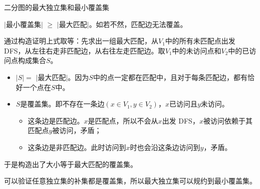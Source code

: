 \documentclass{beamer}
\def\ge{\geqslant}
\begin{document}
\begin{frame}{二分图的最大独立集和最小覆盖集}

	$|$最小覆盖集$|$ $\ge$ $|$最大匹配$|$。如若不然，匹配边无法覆盖。

	通过构造证明上式取等：先求出一组最大匹配，从$V_1$中的所有未匹配点出发 DFS，从左往右走非匹配边，从右往左走匹配边。取$V_1$中的未访问点和$V_2$中的已访问点构成集合$S$。\pause

	\begin{itemize}
		\item $|S| = $ $|$最大匹配$|$。因为$S$中的点一定都在匹配中，且对于每条匹配边，都有恰好一个点在$S$中。
		\item $S$是覆盖集。即不存在一条边$(x \in V_1, y \in V_2)$，$x$已访问且$y$未访问。
		\begin{itemize}
			\item 这条边是匹配边。$x$是匹配点，所以不会从$x$出发 DFS，$x$被访问依赖于其匹配点$y$被访问，矛盾；
			\item 这条边是非匹配边。此时访问到$x$时也会沿这条边访问到$y$，矛盾。
		\end{itemize}
	\end{itemize}

	于是构造出了大小等于最大匹配的覆盖集。\pause

	可以验证任意独立集的补集都是覆盖集，所以最大独立集可以规约到最小覆盖集。

\end{frame}
\end{document}
